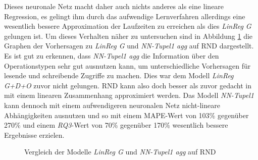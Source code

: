 \documentclass[
	12pt,
	a4paper,
	BCOR10mm,
	DIV14,
	listof=totoc,
	bibliography=totoc,
	headsepline
]{scrreprt}
\begin{document}
Dieses neuronale Netz macht daher auch nichts anderes als eine lineare Regression, es gelingt ihm durch das aufwendige Lernverfahren allerdings eine wesentlich bessere Approximation der Laufzeiten zu erreichen als dies \textit{LinReg G} gelungen ist.
Um dieses Verhalten näher zu untersuchen sind in Abbildung \ref{fig:lin_vergleich} die Graphen der Vorhersagen zu \textit{LinReg G} und \textit{NN-Tupel1 agg} auf RND dargestellt.
Es ist gut zu erkennen, dass \textit{NN-Tupel1 agg} die Information über den Operationstypen sehr gut ausnutzen kann, um unterschiedliche Vorhersagen für lesende und schreibende Zugriffe zu machen.
Dies war dem Modell \textit{LinReg G+D+O} zuvor nicht gelungen.
RND kann also doch besser als zuvor gedacht in mit einem linearen Zusammenhang approximiert werden.
Das Modell \textit{NN-Tupel1} kann dennoch mit einem aufwendigeren neuronalen Netz nicht-lineare Abhängigkeiten ausnutzen und so mit einem MAPE-Wert von 103\% gegenüber 270\% und einem \textit{RQ3}-Wert von 70\% gegenüber 170\% wesentlich bessere Ergebnisse erzielen.
\begin{figure}
	\centering
	\hfill
	\caption{Vergleich der Modelle \textit{LinReg G} und \textit{NN-Tupel1 agg} auf RND}
	\label{fig:lin_vergleich}
\end{figure} 
\clearpage
\end{document}
